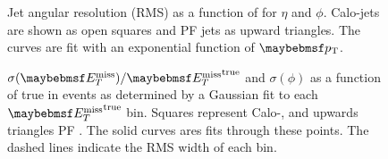 \begin{figure}
\centering
{}\quad
{}\quad
\caption[Jet angular resolution (\ac{RMS}) as a function of \Pt]{Jet angular
  resolution (\ac{RMS}) as a function of \Pt for 
  $\eta$ and  $\phi$. Calo-jets are shown as open
  squares and \ac{PF} jets as upward triangles. The curves are fit with an
  exponential function of $\Pt$.}
\label{fig:reco_pf_jet_angulares}
\end{figure}

\begin{figure}
\centering
{}\quad
{}\quad
\caption[\MET Resolution]{$\sigma(\MET)/\MET^{\textrm{true}}$ and
   $\sigma(\phi)$ as a function of true \MET in
  \ttbar events as determined by a Gaussian fit to each $\MET^{\textrm{true}}$
  bin. Squares represent Calo-\MET, and upwards triangles \ac{PF} \MET. The
  solid curves ares fits through these points. The dashed lines indicate the
  \ac{RMS} width of each bin.}
 \label{fig:reco_pf_met_res}
\end{figure}
